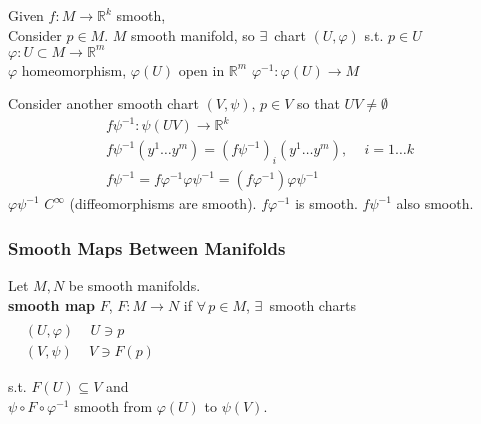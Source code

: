 


 Given $f: M \to \mathbb{R}^k$ smooth, \\
Consider $p \in M$.  $M$ smooth manifold, so $\exists \, $ chart $(U,\varphi)$ s.t. $p \in U$ \\
$\varphi : U \subset M \to \mathbb{R}^m$ \\
$\varphi$ homeomorphism, $\varphi(U)$ open in $\mathbb{R}^m$  
$\varphi^{-1}: \varphi(U) \to M$

Consider another smooth chart $(V,\psi)$, $p\in V$ so that $UV \neq \emptyset$
\[
\begin{gathered}
  f\psi^{-1} : \psi(UV) \to \mathbb{R}^k \\ 
  f\psi^{-1}(y^1 \dots y^m ) = (f\psi^{-1})_i(y^1 \dots y^m) , \quad \, i = 1\dots k \\
  f\psi^{-1} = f\varphi^{-1}\varphi \psi^{-1} = (f\varphi^{-1}) \varphi \psi^{-1}
\end{gathered}
\]
$\varphi \psi^{-1}$ $C^{\infty}$ (diffeomorphisms are smooth).  $f\varphi^{-1}$ is smooth.  $f\psi^{-1}$ also smooth.  

\subsubsection*{Smooth Maps Between Manifolds}

\begin{definition}
  Let $M,N$ be smooth manifolds.  \\
  \textbf{smooth map } $F$, $F:M \to N$ if $\forall \, p \in M$, $\exists \, $ smooth charts $\begin{aligned} & \quad \\
    & (U,\varphi) \quad \, U \ni p \\
    & (V,\psi) \quad \, V \ni F(p) \end{aligned}$

s.t. $F(U) \subseteq V$ and \\
\phantom{s.t. } $\psi \circ F \circ \varphi^{-1}$ smooth from $\varphi(U)$ to $\psi(V)$.  
\end{definition}


